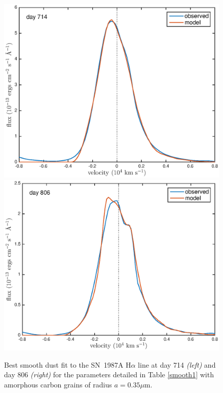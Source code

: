\documentclass[useAMS,usenatbib,usegraphicx]{mnras}
\begin{document}
\begin{figure}
\begin{center}
\includegraphics[trim =37 10 45 15,clip=true,scale=0.41]{smooth/best_fit/d714Ha}
\includegraphics[trim =37 10 45 15,clip=true,scale=0.41]{smooth/best_fit/d806Ha}
\caption{Best smooth dust fit to the SN~1987A H$\alpha$ line at day 714 \textit{\textit{(left)}} and day 806 \textit{\textit{(right)}} for the parameters detailed in Table \ref{smooth1} with amorphous carbon grains of radius $a=0.35 \mu$m.}
\label{Ha_smooth}
\end{center}
\end{figure}
\end{document}
